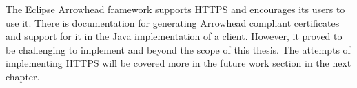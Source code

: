 The Eclipse Arrowhead framework supports HTTPS and encourages its users to use it.
There is documentation for generating Arrowhead compliant certificates and support for it in the Java implementation of a client.
However, it proved to be challenging to implement and beyond the scope of this thesis. 
The attempts of implementing HTTPS will be covered more in the future work section in the next chapter.